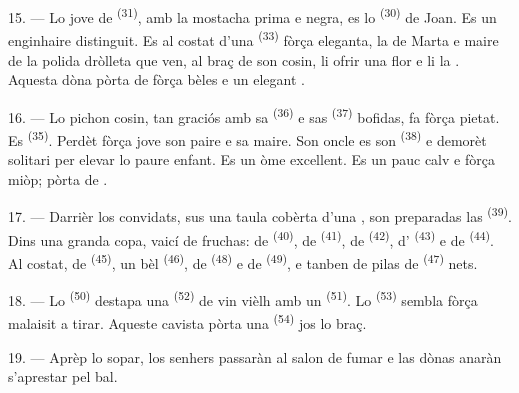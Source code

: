 15. --- Lo jove de  \textsuperscript{(31)}, amb la mostacha prima e
negra, es lo  \textsuperscript{(30)} de Joan. Es un enginhaire
distinguit. Es al costat d'una  \textsuperscript{(33)} fòrça
eleganta, la  de Marta e maire de la polida dròlleta que ven,
al braç de son cosin, li ofrir una flor e li  la . Aquesta dòna pòrta de  fòrça bèles e un elegant
.

16. --- Lo pichon cosin, tan graciós amb sa 
\textsuperscript{(36)} e sas  \textsuperscript{(37)} bofidas, fa
fòrça pietat. Es  \textsuperscript{(35)}. Perdèt fòrça jove son
paire e sa maire. Son oncle es son  \textsuperscript{(38)} e demorèt
solitari per elevar lo paure enfant. Es un òme excellent. Es un pauc calv e fòrça
miòp; pòrta de .

\VUsaut{2.4mm}
\VUsaut{3.0mm}

17. --- Darrièr los convidats, sus una taula cobèrta d'una , son
preparadas las  \textsuperscript{(39)}. Dins una granda copa,
vaicí de fruchas: de  \textsuperscript{(40)}, de 
\textsuperscript{(41)}, de  \textsuperscript{(42)}, d'
\textsuperscript{(43)} e de  \textsuperscript{(44)}. Al costat, de
 \textsuperscript{(45)}, un bèl 
\textsuperscript{(46)}, de  \textsuperscript{(48)} e de
 \textsuperscript{(49)}, e tanben de pilas de 
\textsuperscript{(47)} nets.

18. --- Lo  \textsuperscript{(50)} destapa una 
\textsuperscript{(52)} de vin vièlh amb un 
\textsuperscript{(51)}. Lo  \textsuperscript{(53)} sembla fòrça
malaisit a tirar. Aqueste cavista pòrta una 
\textsuperscript{(54)} jos lo braç.

19. --- Aprèp lo sopar, los senhers passaràn al salon de fumar e las dònas
anaràn s'aprestar pel bal.

\VUsaut{5.0mm}
\VUsaut{1.6mm}
\VUsaut{2.6mm}

